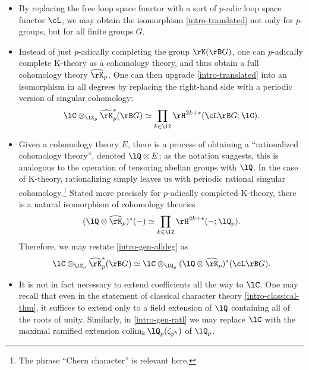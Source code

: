 \begin{itemize}[leftmargin=*]
\item By replacing the free loop space functor with a sort of $p$-adic
  loop space functor $\cL$, we may obtain the isomorphism
  \cref{intro-translated} not only for $p$-groups, but for all finite
  groups $G$.

\item Instead of just $p$-adically completing the group $\rK(\rB G)$,
  one can $p$-adically complete K-theory as a cohomology theory, and
  thus obtain a full cohomology theory $\hat\rK_p$. One can then
  upgrade \cref{intro-translated} into an isomorphism in all degrees
  by replacing the right-hand side with a periodic version of singular
  cohomology:
  \begin{equation}
    \label{intro-gen-alldeg}
      \lC \otimes_{\lZ_p} \hat\rK_p^*(\rB G) \iso
      \prod_{k \in \lZ} \rH^{2k+*}(\cL\rB G;\lC).
  \end{equation}

\item Given a cohomology theory $E$, there is a process of obtaining a
  ``rationalized cohomology theory'', denoted $\lQ \otimes E$; as the
  notation suggests, this is analogous to the operation of tensoring
  abelian groups with $\lQ$. In the case of K-theory, rationalizing
  simply leaves us with periodic rational singular
  cohomology.\footnote{The phrase ``Chern character'' is relevant
    here.} Stated more precisely for $p$-adically completed K-theory,
  there is a natural isomorphism of cohomology theories
  \[
  (\lQ \otimes \hat\rK_p)^*(-) \iso
  \prod_{k \in \lZ} \rH^{2k+*}(-;\lQ_p).
  \]
  Therefore, we may restate \cref{intro-gen-alldeg} as
  \begin{equation}
    \label{intro-gen-ratl}
    \lC \otimes_{\lZ_p} \hat\rK_p^*(\rB G) \iso
    \lC \otimes_{\lQ_p} (\lQ \otimes \hat\rK_p)^*(\cL\rB G).
  \end{equation}

\item It is not in fact necessary to extend coefficients all the way
  to $\lC$. One may recall that even in the statement of classical
  character theory \cref{intro-classical-thm}, it suffices to extend
  only to a field extension of $\lQ$ containing all of the roots of
  unity. Similarly, in \cref{intro-gen-ratl} we may replace $\lC$ with
  the maximal ramified extension $\colim_k \lQ_p(\zeta_{p^k})$ of
  $\lQ_p$.


\end{itemize}
